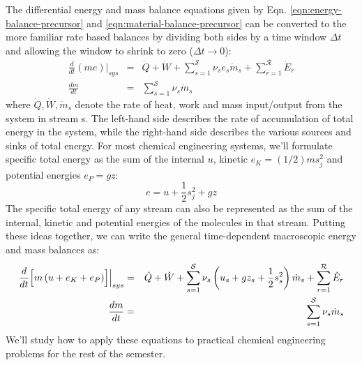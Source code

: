 \documentclass[11pt]{article}
\theoremstyle{definition}
\begin{document}
The differential energy and mass balance equations given by Eqn. \eqref{eqn:energy-balance-precursor} and \eqref{eqn:material-balance-precursor} can be converted to
the more familiar rate based balances by dividing both sides by a time window $\Delta{t}$ and allowing the window to shrink to zero ($\Delta{t}\rightarrow{0}$):
\begin{eqnarray}
\frac{d}{dt}\left(me\right)\Bigr|_{sys} &=& \dot{Q}+\dot{W}+\sum_{s=1}^{\mathcal{S}}\nu_{s}e_{s}\dot{m}_{s}+ \sum_{r=1}^{\mathcal{R}}\dot{E}_{r}\\
\frac{dm}{dt} &=& \sum_{s=1}^{\mathcal{S}}\nu_{s}\dot{m}_{s}
\end{eqnarray}where $\dot{Q},\dot{W},\dot{m}_{s}$ denote the rate of heat, work and mass input/output from the system in stream s.
The left-hand side describes the rate of accumulation of total energy in the system, while the right-hand side describes the various sources and sinks of total energy.
For most chemical engineering systems, we'll formulate specific total energy as the sum of the internal $u$, kinetic $e_{K}=(1/2)ms_{j}^{2}$ and potential energies $e_{P}=gz$:
\begin{equation}
e = u + \frac{1}{2}s_{j}^{2} + gz
\end{equation}The specific total energy of any stream can also be represented as the sum of the internal, kinetic and potential energies of the molecules in that stream.
Putting these ideas together, we can write the general time-dependent macroscopic energy and mass balances as:
\begin{eqnarray}\label{eqn:general-open-balance}
	\frac{d}{dt}\Bigl[m\left(u+e_{K}+e_{P}\right)\Bigr]\Bigr|_{sys} &=& \dot{Q}+\dot{W}+\sum_{s=1}^{\mathcal{S}}\nu_{s}\left(u_{s}+gz_{s}+\frac{1}{2}s_{s}^{2}\right)\dot{m}_{s}+\sum_{r=1}^{\mathcal{R}}\dot{E}_{r}\\\label{eqn:total-mass-balance}
	\frac{dm}{dt} &=& \sum_{s=1}^{\mathcal{S}}\nu_{s}\dot{m}_{s}
\end{eqnarray}
We'll study how to apply these equations to practical chemical engineering problems for the rest of the semester.
\end{document}
